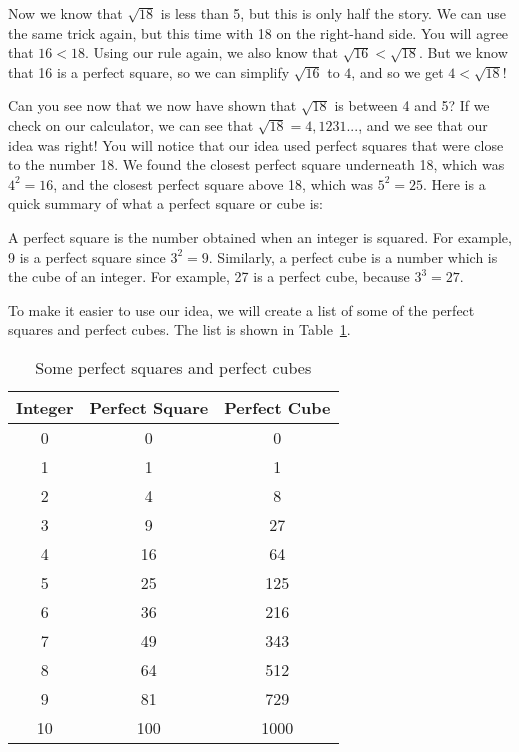 \documentclass[10pt,a4paper,titlepage,twoside,openright]{report}
\begin{document}
Now we know that $\sqrt{18}$ is less than 5, but this is only half the story. We can use the same trick again, but this time with 18 on the right-hand side. You will agree that $16 < 18$. Using our rule again, we also know that $\sqrt{16} < \sqrt{18}$. But we know that 16 is a perfect square, so we can simplify $\sqrt{16}$ to $4$, and so we get $4 < \sqrt{18}$! 

Can you see now that we now have shown that $\sqrt{18}$ is between 4 and 5? If we check on our calculator, we can see that $\sqrt{18} = 4,1231...$, and we see that our idea was right! You will notice that our idea used perfect squares that were close to the number 18. We found the closest perfect square underneath 18, which was $4^2 = 16$, and the closest perfect square above 18, which was $5^2 = 25$. Here is a quick summary of what a perfect square or cube is: 

\begin{IFact}{A perfect square is the number obtained when an integer is squared. For example, 9 is a perfect square since $3^2=9$. Similarly, a perfect cube is a number which is the cube of an integer. For example, 27 is a perfect cube, because $3^3=27$.}\end{IFact}

To make it easier to use our idea, we will create a list of some of the perfect squares and perfect cubes. The list is shown in Table~\ref{tab:mn:s:perfectsquarecube}.

\begin{table}[htbp]
\begin{center}
\caption{Some perfect squares and perfect cubes}
\label{tab:mn:s:perfectsquarecube}
\begin{tabular}{|c|c|c|}\hline
Integer & Perfect Square & Perfect Cube\\\hline\hline
0&0&0\\\hline
1&1&1\\\hline
2&4&8\\\hline
3&9&27\\\hline
4&16&64\\\hline
5&25&125\\\hline
6&36&216\\\hline
7&49&343\\\hline
8&64&512\\\hline
9&81&729\\\hline
10&100&1000\\\hline
\end{tabular}
\end{center}
\end{table}
\end{document}
